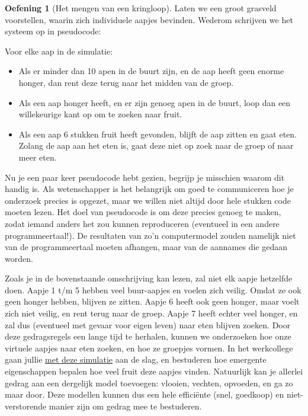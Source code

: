 \documentclass[
  a4paper,
]{scrbook}
\providecommand{\tightlist}{%
  \setlength{\itemsep}{0pt}\setlength{\parskip}{0pt}}\usepackage{longtable,booktabs,array}
\theoremstyle{definition}
\newtheorem{exercise}{Oefening}[chapter]
\theoremstyle{remark}
\begin{document}
\begin{exercise}[Het mengen van een
kringloop]
Laten we een groot grasveld voorstellen, waarin zich individuele aapjes
bevinden. Wederom schrijven we het systeem op in pseudocode:

Voor elke aap in de simulatie:

\begin{itemize}
\tightlist
\item
  Als er minder dan 10 apen in de buurt zijn, en de aap heeft geen
  enorme honger, dan rent deze terug naar het midden van de groep.
\item
  Als een aap honger heeft, en er zijn genoeg apen in de buurt, loop dan
  een willekeurige kant op om te zoeken naar fruit.
\item
  Als een aap 6 stukken fruit heeft gevonden, blijft de aap zitten en
  gaat eten. Zolang de aap aan het eten is, gaat deze niet op zoek naar
  de groep of naar meer eten.
\end{itemize}

\begin{tcolorbox}[enhanced jigsaw, rightrule=.15mm, opacityback=0, leftrule=.75mm, title=\textcolor{quarto-callout-note-color}{\faInfo}\hspace{0.5em}{Opmerking}, toptitle=1mm, titlerule=0mm, opacitybacktitle=0.6, colframe=quarto-callout-note-color-frame, breakable, colbacktitle=quarto-callout-note-color!10!white, coltitle=black, toprule=.15mm, bottomrule=.15mm, left=2mm, bottomtitle=1mm, arc=.35mm, colback=white]

Nu je een paar keer pseudocode hebt gezien, begrijp je misschien waarom
dit handig is. Als wetenschapper is het belangrijk om goed te
communiceren hoe je onderzoek precies is opgezet, maar we willen niet
altijd door hele stukken code moeten lezen. Het doel van pseudocode is
om deze precies genoeg te maken, zodat iemand anders het zou kunnen
reproduceren (eventueel in een andere programmeertaal!). De resultaten
van zo'n computermodel zouden namelijk niet van de programmeertaal
moeten afhangen, maar van de aannames die gedaan worden.

\end{tcolorbox}

Zoals je in de bovenstaande omschrijving kan lezen, zal niet elk aapje
hetzelfde doen. Aapje 1 t/m 5 hebben veel buur-aapjes en voelen zich
veilig. Omdat ze ook geen honger hebben, blijven ze zitten. Aapje 6
heeft ook geen honger, maar voelt zich niet veilig, en rent terug naar
de groep. Aapje 7 heeft echter veel honger, en zal dus (eventueel met
gevaar voor eigen leven) naar eten blijven zoeken. Door deze
gedragsregels een lange tijd te herhalen, kunnen we onderzoeken hoe onze
virtuele aapjes naar eten zoeken, en hoe ze groepjes vormen. In het
werkcollege gaan jullie
\href{https://tbb.bio.uu.nl/bvd/bms/simulations/aapjes/}{met deze
simulatie} aan de slag, en bestuderen hoe emergente eigenschappen
bepalen hoe veel fruit deze aapjes vinden. Natuurlijk kan je allerlei
gedrag aan een dergelijk model toevoegen: vlooien, vechten, opvoeden, en
ga zo maar door. Deze modellen kunnen dus een hele efficiënte (snel,
goedkoop) en niet-verstorende manier zijn om gedrag mee te bestuderen.


\end{exercise}
\end{document}
